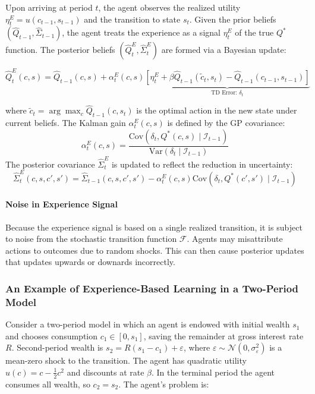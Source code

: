 \begin{definition}
    Upon arriving at period $t$, the agent observes the realized utility $\eta^E_t = u(c_{t-1}, s_{t-1})$ and the transition to state $s_t$. Given the prior beliefs $(\hat{Q}_{t-1}, \hat{\Sigma}_{t-1})$, the agent treats the experience as a signal $\eta^E_t$ of the true $Q^*$ function. The posterior beliefs $(\hat{Q}^E_t, \hat{\Sigma}^E_t)$ are formed via a Bayesian update:

    \begin{equation}
        \hat{Q}^E_t(c,s) = \hat{Q}_{t-1}(c,s) + \alpha^E_t(c,s) \underbrace{\left[ \eta^E_t + \beta \hat{Q}_{t-1}(\tilde{c}_t, s_t) - \hat{Q}_{t-1}(c_{t-1}, s_{t-1}) \right]}_{\text{TD Error: } \delta_t}
    \end{equation}

    where $\tilde{c}_t = \arg\max_{c} \hat{Q}_{t-1}(c, s_t)$ is the optimal action in the new state under current beliefs. The Kalman gain $\alpha^E_t(c,s)$ is defined by the GP covariance:
    \begin{equation}
        \alpha^E_t(c,s) = \frac{\text{Cov}(\delta_t, Q^*(c,s) \mid \mathcal{I}_{t-1})}{\text{Var}(\delta_t \mid \mathcal{I}_{t-1})}
    \end{equation}
    The posterior covariance $\hat{\Sigma}^E_t$ is updated to reflect the reduction in uncertainty:
    \begin{equation}
        \hat{\Sigma}^E_t(c,s,c',s') = \hat{\Sigma}_{t-1}(c,s,c',s') - \alpha^E_t(c,s) \text{Cov}(\delta_t, Q^*(c',s') \mid \mathcal{I}_{t-1})
    \end{equation}
\end{definition}

\paragraph{Noise in Experience Signal} Because the experience signal is based on a single realized transition, it is subject
to noise from the stochastic transition function $\mathcal{F}$. Agents may
misattribute actions to outcomes due to random shocks. This can then cause posterior updates
that updates upwards or downards incorrectly.

\subsubsection{An Example of Experience-Based Learning in a Two-Period Model}

Consider a two-period model in which an agent is endowed with initial wealth $s_1$ and 
chooses consumption $c_1 \in [0, s_1]$, saving the remainder at gross interest rate $R$.
Second-period wealth is $s_2 = R(s_1 - c_1) + \varepsilon$, where
$\varepsilon \sim \mathcal{N}(0, \sigma_\varepsilon^2)$ is a mean-zero shock to the 
transition. The agent has quadratic utility $u(c) = c - \frac{1}{2}c^2$ and
discounts at rate $\beta$. In the terminal period the agent 
consumes all wealth, so $c_2 = s_2$. The agent's problem is:

